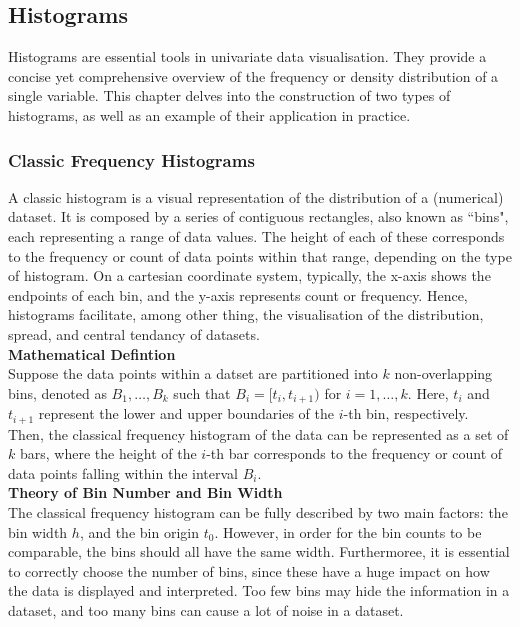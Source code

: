 \documentclass{article}\usepackage[]{graphicx}\usepackage[]{xcolor}
\numberwithin{equation}{section}
\begin{document}
\subsection{Histograms}

\noindent Histograms are essential tools in univariate data visualisation. They provide a concise yet comprehensive overview of the frequency or density distribution of a single variable. This chapter delves into the construction of two types of histograms, as well as an example of their application in practice.

\subsubsection{Classic Frequency Histograms}

\noindent A classic histogram is a visual representation of the distribution of a (numerical) dataset. It is composed by a series of contiguous rectangles, also known as ``bins", each representing a range of data values. The height of each of these corresponds to the frequency or count of data points within that range, depending on the type of histogram. On a cartesian coordinate system, typically, the x-axis shows the endpoints of each bin, and the y-axis represents count or frequency. Hence, histograms facilitate, among other thing, the visualisation of the distribution, spread, and central tendancy of datasets.\\

\noindent \textbf{Mathematical Defintion}\\
\noindent Suppose the data points within a datset are partitioned into $k$ non-overlapping bins, denoted as $B_1, \dots, B_k$ such that $B_i = [t_i, t_{i+1})$ for $i = 1, \dots, k$. Here, $t_i$ and $t_{i+1}$ represent the lower and upper boundaries of the $i$-th bin, respectively.\\

\noindent Then, the classical frequency histogram of the data can be represented as a set of $k$ bars, where the height of the $i$-th bar corresponds to the frequency or count of data points falling within the interval $B_i$.\\

\noindent \textbf{Theory of Bin Number and Bin Width}\\
\noindent The classical frequency histogram can be fully described by two main factors: the bin width $h$, and the bin origin $t_{0}$. However, in order for the bin counts to be comparable, the bins should all have the same width. Furthermoree, it is essential to correctly choose the number of bins, since these have a huge impact on how the data is displayed and interpreted. Too few bins may hide the information in a dataset, and too many bins can cause a lot of noise in a dataset.\\
\end{document}
